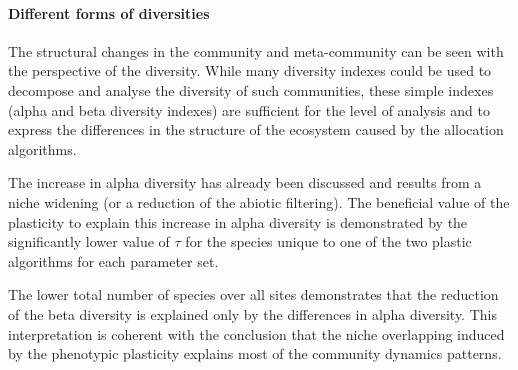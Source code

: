 \paragraph{Different forms of diversities}

The structural changes in the community and meta-community can be seen with the perspective of the diversity. While many diversity indexes could be used to decompose and analyse the diversity of such communities, these simple indexes (alpha and beta diversity indexes) are sufficient for the level of analysis and to express the differences in the structure of the ecosystem caused by the allocation algorithms.

The increase in alpha diversity has already been discussed and results from a niche widening (or a reduction of the abiotic filtering). The beneficial value of the plasticity to explain this increase in alpha diversity is demonstrated by the significantly lower value of $\tau$ for the species unique to one of the two plastic algorithms for each parameter set. 


The lower total number of species over all sites demonstrates that the reduction of the beta diversity is explained only by the differences in alpha diversity. This interpretation is coherent with the conclusion that the niche overlapping induced by the phenotypic plasticity explains most of the community dynamics patterns.


